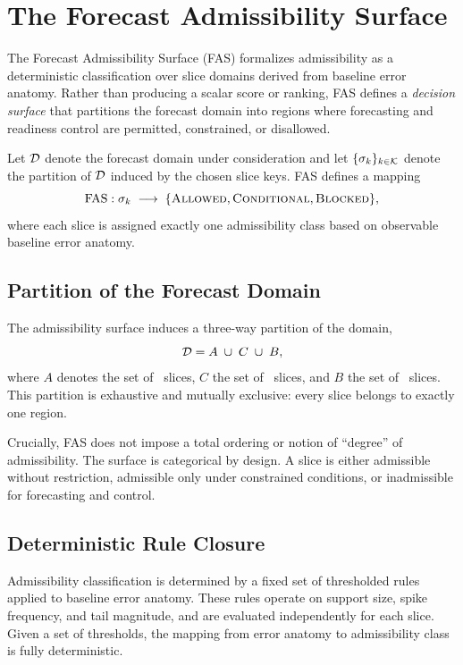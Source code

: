
\section{The Forecast Admissibility Surface}
\label{sec:fas_surface}

The Forecast Admissibility Surface (FAS) formalizes admissibility as a
deterministic classification over slice domains derived from baseline error
anatomy. Rather than producing a scalar score or ranking, FAS defines a
\emph{decision surface} that partitions the forecast domain into regions where
forecasting and readiness control are permitted, constrained, or disallowed.

Let $\mathcal{D}$ denote the forecast domain under consideration and let
$\{\sigma_k\}_{k \in \mathcal{K}}$ denote the partition of $\mathcal{D}$ induced by the
chosen slice keys. FAS defines a mapping
\[
\mathrm{FAS} : \sigma_k \;\longrightarrow\; \{\textsc{Allowed}, \textsc{Conditional}, \textsc{Blocked}\},
\]
where each slice is assigned exactly one admissibility class based on observable
baseline error anatomy.

\subsection{Partition of the Forecast Domain}

The admissibility surface induces a three-way partition of the domain,
\[
\mathcal{D} = A \;\cup\; C \;\cup\; B,
\]
where $A$ denotes the set of \Allowed\ slices, $C$ the set of
\Conditional\ slices, and $B$ the set of \Blocked\ slices. This partition is
exhaustive and mutually exclusive: every slice belongs to exactly one region.

Crucially, FAS does not impose a total ordering or notion of “degree” of
admissibility. The surface is categorical by design. A slice is either admissible
without restriction, admissible only under constrained conditions, or
inadmissible for forecasting and control.

\subsection{Deterministic Rule Closure}

Admissibility classification is determined by a fixed set of thresholded rules
applied to baseline error anatomy. These rules operate on support size, spike
frequency, and tail magnitude, and are evaluated independently for each slice.
Given a set of thresholds, the mapping from error anatomy to admissibility class
is fully deterministic.

